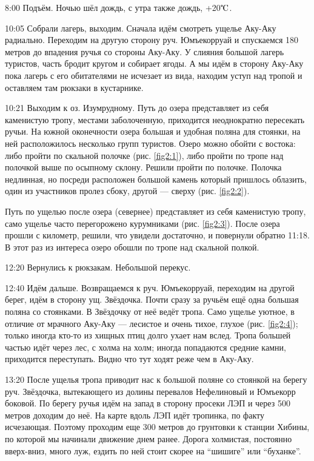 8:00 Подъём.
Ночью шёл дождь, с утра также дождь, +20$\tccentigrade$.

10:05 Собрали лагерь, выходим. Сначала идём смотреть ущелье Аку-Аку радиально.
Переходим на другую сторону руч. Юмъекорруай и спускаемся 180 метров до впадения ручья со стороны Аку-Аку.
У слияния большой лагерь туристов, часть бродит кругом и собирает ягоды. А мы идём в сторону Аку-Аку пока лагерь
с его обитателями не исчезает из вида, находим уступ над тропой и оставляем там рюкзаки в кустарнике.

10:21 Выходим к оз. Изумрудному. Путь до озера представляет из себя каменистую тропу, местами заболоченную,
приходится неоднократно пересекать ручьи. На южной оконечности озера большая и удобная поляна для стоянки,
на ней расположилось несколько групп туристов. Озеро можно обойти с востока: либо пройти по скальной полочке (рис. \ref{fig2:1}),
либо пройти по тропе над полочкой выше по осыпному склону. Решили пройти по полочке.
Полочка недлинная, но посреди расположен большой камень который пришлось облазить, один из участников пролез сбоку,
другой --- сверху (рис. \ref{fig2:2}).

Путь по ущелью после озера (севернее) представляет из себя каменистую тропу,
само ущелье часто перегорожено курумниками (рис. \ref{fig2:3}).
После озера прошли с километр, решили, что увидели достаточно, и повернули обратно 11:18.
В этот раз из интереса озеро обошли по тропе над скальной полкой.

12:20 Вернулись к рюкзакам. Небольшой перекус.

12:40 Идём дальше. Возвращаемся к руч. Юмъекорруай, переходим на другой берег, идём в сторону ущ. Звёздочка.
Почти сразу за ручьём ещё одна большая поляна со стоянками. В Звёздочку от неё ведёт тропа.
Само ущелье уютное, в отличие от мрачного Аку-Аку --- лесистое и очень тихое, глухое (рис. \ref{fig2:4});
только иногда кто-то из хищных птиц долго ухает нам вслед. Тропа большей частью идёт через лес, с холма на холм;
иногда попадаются средние камни, приходится переступать. Видно что тут ходят реже чем в Аку-Аку.

13:20 После ущелья тропа приводит нас к большой поляне со стоянкой на берегу руч.
Звёздочка, вытекающего из долины перевалов Нефелиновый и Юмъекорр боковой.
По берегу ручья идём на запад в сторону просеки ЛЭП и через 500 метров доходим до неё.
На карте вдоль ЛЭП идёт тропинка, по факту исчезающая. Поэтому проходим еще 300 метров до грунтовки к станции Хибины,
по которой мы начинали движение днем ранее. Дорога холмистая, постоянно вверх-вниз, много луж,
ездить по ней стоит скорее на ``шишиге'' или ``буханке''.

